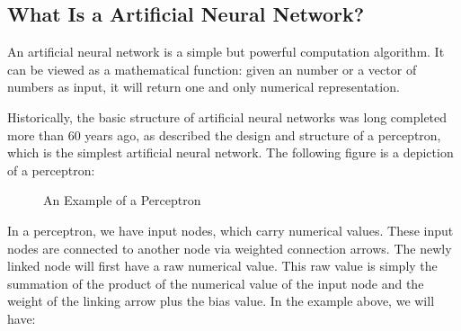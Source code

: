 \documentclass[final]{ua-thesis}
\numberwithin{equation}{section}
\begin{document}
\subsection{What Is a Artificial Neural Network?}

An artificial neural network is a simple but powerful computation algorithm. It can be viewed as a mathematical function: given an number or a vector of numbers as input, it will return one and only numerical representation. 

Historically, the basic structure of artificial neural networks was long completed more than 60 years ago, 
as \citet{rosenblatt} described the design and structure of a perceptron, which is the simplest artificial neural network. The following figure is a depiction of a perceptron: 

\begin{figure}[h]
\caption{An Example of a Perceptron}
\end{figure}

In a perceptron, we have input nodes, which carry numerical values. These input nodes are connected to another node via weighted connection arrows. The newly linked node will first have a raw numerical value. This raw value is simply the summation of the product of the numerical value of the input node and the weight of the linking arrow plus the bias value. In the example above, we will have:
\end{document}
